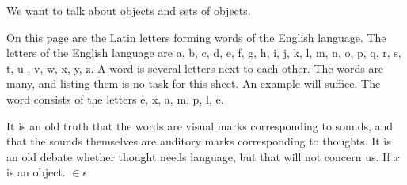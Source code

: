 
We want to talk about objects and sets of objects.


On this page are the Latin letters forming words of the English language.
The letters of the English language are a, b, c, d, e, f, g, h, i, j, k, l, m, n, o, p, q, r, s, t, u , v, w, x, y, z.
A word is several letters next to each other.
The words are many, and listing them is no task for this sheet.
An example will suffice.
The word  consists of the letters e, x, a, m, p, l, e.

It is an old truth that the words are visual marks corresponding to sounds, and that the sounds themselves are auditory marks corresponding to thoughts.
It is an old debate whether thought needs language, but that will not concern us.
If $x$ is an object.
$\in$$\epsilon$

%
%
%
%
%
%
%
%
%


